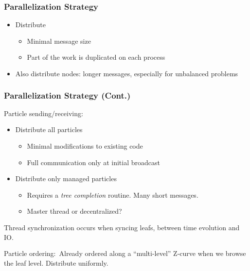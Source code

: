 \begin{frame}
	\frametitle{Parallelization Strategy}
	\begin{itemize}
		\item Distribute \only<2>{\alert{only particles}}
		\begin{itemize}
			\item Minimal message size
			\item Part of the work is duplicated on each process
		\end{itemize}
		\item Also distribute nodes: longer messages, especially for unbalanced problems
	\end{itemize}
\end{frame}

\begin{frame}
\frametitle{Parallelization Strategy (Cont.)}
Particle sending/receiving:
\begin{itemize}
	\item Distribute all particles
	\begin{itemize}
		\item Minimal modifications to existing code
		\item Full communication only at initial broadcast
	\end{itemize}
	\item Distribute only managed particles
	\begin{itemize}
		\item Requires a \emph{tree completion} routine. Many short messages.
		\item Master thread or decentralized?
	\end{itemize}
\end{itemize}
\par
Thread synchronization occurs when syncing leafs, between time evolution and IO.
\par
Particle ordering:~Already ordered along a ``multi-level'' Z-curve when we browse the leaf level. Distribute uniformly.
\end{frame}

